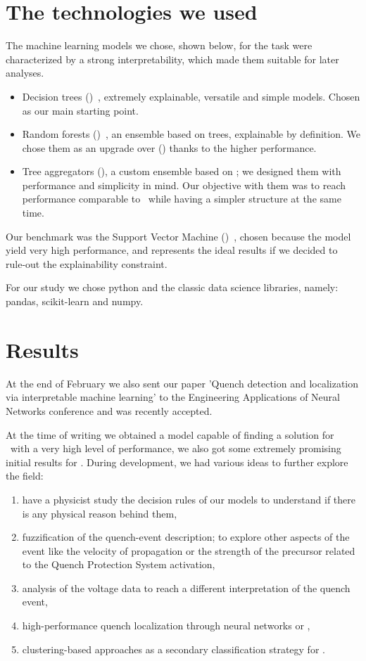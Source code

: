 \documentclass[a4paper, notitlepage]{article}
\begin{document}
\section{The technologies we used}
The machine learning models we chose, shown below, for the task were characterized by a strong
interpretability, which made them suitable for later analyses.
\begin{itemize}
	\item Decision trees (\dts)~\cite{breiman1984-dt}, extremely explainable, versatile and
	      simple models. Chosen as our main starting point.
	\item Random forests (\rfs)~\cite{breiman2001-rf}, an ensemble based on trees, explainable
	      by definition. We chose them as an upgrade over (\dts) thanks to the higher
	      performance.
	\item Tree aggregators (\tas), a custom ensemble based on \dts; we designed them with
	      performance and simplicity in mind. Our objective with them was to reach performance
	      comparable to \rfs\ while having a simpler structure at the same time.
\end{itemize}
Our benchmark was the Support Vector Machine (\svm)~\cite{cortes1995-svm}, chosen because the model yield very high
performance, and represents the ideal results if we decided to rule-out the explainability constraint.

For our study we chose python and the classic data science libraries, namely: pandas,
scikit-learn and numpy.

\section{Results}
At the end of February we also sent our paper 'Quench detection and localization via
interpretable machine learning' to the Engineering Applications of Neural Networks conference and
was recently accepted.

At the time of writing we obtained a model capable of finding a solution for \qrp\ with a very
high level of performance, we also got some extremely promising initial results for \qlp. During
development, we had various ideas to further explore the field:
\begin{enumerate}
	\item have a physicist study the decision rules of our models to understand if there is
	      any physical reason behind them,
	\item fuzzification of the quench-event description; to explore other aspects of the event
	      like the velocity of propagation or the strength of the precursor related to the
	      Quench Protection System activation,
	\item analysis of the voltage data to reach a different interpretation of the quench event,
	\item high-performance quench localization through neural networks or \svcs,
	\item clustering-based approaches as a secondary classification strategy for \qlp.
\end{enumerate}
\end{document}
